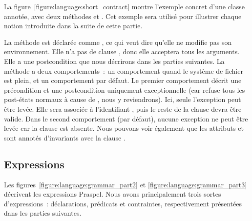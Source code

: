 \begin{example} La
figure~\ref{figure:language:short_contract} montre l'exem\-ple concret d'une
classe  annotée, avec deux méthodes  et
. Cet exemple sera utilisé pour illustrer chaque notion introduite
dans la suite de cette partie.

La méthode  est déclarée comme , ce qui veut dire
qu'elle ne modifie pas son environnement. Elle n'a pas de clause \arequires,
donc elle acceptera tous les arguments. Elle a une postcondition que nous
décrirons dans les parties suivantes. La méthode  a deux
comportements~: un comportement  quand le système de fichier est
plein, et un comportement par défaut. Le premier comportement décrit une
précondition et une postcondition uniquement exceptionnelle (car \aensures
refuse tous les post-états normaux à cause de \anone, nous y reviendrons).
Ici, seule l'exception  peut être levée. Elle sera
associée à l'identifiant , puis le reste de la clause devra être valide.
Dans le second comportement (par défaut), aucune exception ne peut être levée
car la clause \athrowable est absente. Nous pouvons voir également que les
attributs  et  sont annotés d'invariants avec la
clause \ainvariant.

\end{example}

\subsection{Expressions}
\label{subsection:language:expressions}

Les figures~\ref{figure:language:grammar_part2} et
\ref{figure:language:grammar_part3} décrivent les expressions Praspel. Nous
avons principalement trois sortes d'expressions~: déclarations, prédicats et
contraintes, respectivement présentées dans les parties suivantes.

